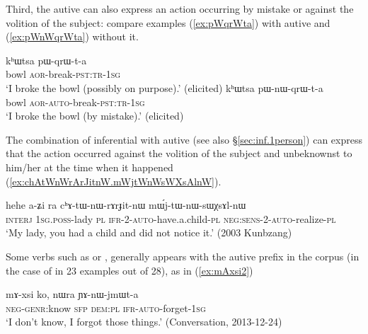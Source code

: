 Third, the autive can also express an action occurring by mistake or against the volition of the subject: compare examples (\ref{ex:pWqrWta}) with autive and (\ref{ex:pWnWqrWta}) without it.

\begin{exe}
\ex 
\begin{xlist}
\ex \label{ex:pWqrWta}
\gll kʰɯtsa pɯ-qrɯ-t-a\\
bowl \textsc{aor}-break-\textsc{pst}:\textsc{tr}-\textsc{1sg} \\
\glt `I broke the bowl (possibly on purpose).' (elicited)
\ex \label{ex:pWnWqrWta}
\gll kʰɯtsa pɯ-nɯ-qrɯ-t-a\\
bowl \textsc{aor}-\textsc{auto}-break-\textsc{pst}:\textsc{tr}-\textsc{1sg} \\
\glt `I broke the bowl (by mistake).' (elicited)
\end{xlist} 
\end{exe}

The combination of inferential with autive (see also §\ref{sec:inf.1person}) can express that the action occurred against the volition of the subject and unbeknownst to him/her at the time when it happened (\ref{ex:chAtWnWrArJitnW.mWjtWnWsWXsAlnW}).

\begin{exe}
\ex \label{ex:chAtWnWrArJitnW.mWjtWnWsWXsAlnW}
\gll hehe a-ʑi ra cʰɤ-tɯ-nɯ-rɤrɟit-nɯ mɯ́j-tɯ-nɯ-sɯχsɤl-nɯ  \\
\textsc{interj} \textsc{1sg}.\textsc{poss}-lady \textsc{pl} \textsc{ifr}-2-\textsc{auto}-have.a.child-\textsc{pl} \textsc{neg}:\textsc{sens}-2-\textsc{auto}-realize-\textsc{pl}  \\
\glt `My lady, you had a child and did not notice it.' (2003 Kunbzang)
\end{exe}

Some verbs such as  or , generally appears with the autive prefix in the corpus (in the case of  in 23 examples out of 28), as in  (\ref{ex:mAxsi2})  
 
\begin{exe}
 \ex \label{ex:mAxsi2}
 \gll mɤ-xsi ko, nɯra ɲɤ-nɯ-jmɯt-a  \\
\textsc{neg}-\textsc{genr}:know \textsc{sfp} \textsc{dem}:\textsc{pl} \textsc{ifr}-\textsc{auto}-forget-\textsc{1sg} \\
\glt `I don't know, I forgot those things.' (Conversation, 2013-12-24)
\end{exe}

